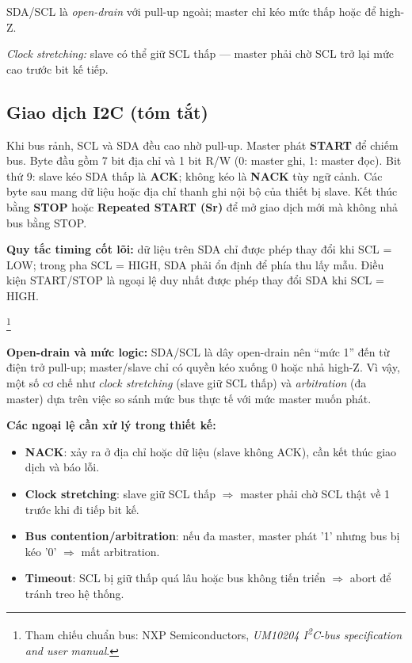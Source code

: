SDA/SCL là \emph{open-drain} với pull-up ngoài; master chỉ kéo mức thấp hoặc để high-Z.

\textit{Clock stretching:} slave có thể giữ SCL thấp — master phải chờ SCL trở lại mức cao trước bit kế tiếp.

\subsection{Giao dịch I2C (tóm tắt)}
Khi bus rảnh, SCL và SDA đều cao nhờ pull-up. Master phát \textbf{START} để chiếm bus. Byte đầu gồm 7 bit địa chỉ và 1 bit R/W (0: master ghi, 1: master đọc). Bit thứ 9: slave kéo SDA thấp là \textbf{ACK}; không kéo là \textbf{NACK} tùy ngữ cảnh. Các byte sau mang dữ liệu hoặc địa chỉ thanh ghi nội bộ của thiết bị slave. Kết thúc bằng \textbf{STOP} hoặc \textbf{Repeated START (Sr)} để mở giao dịch mới mà không nhả bus bằng STOP.

\textbf{Quy tắc timing cốt lõi:} dữ liệu trên SDA chỉ được phép thay đổi khi SCL = LOW; trong pha SCL = HIGH, SDA phải ổn định để phía thu lấy mẫu. Điều kiện START/STOP là ngoại lệ duy nhất được phép thay đổi SDA khi SCL = HIGH.

\footnote{Tham chiếu chuẩn bus: NXP Semiconductors, \emph{UM10204 I\textsuperscript{2}C-bus specification and user manual}.}

\textbf{Open-drain và mức logic:} SDA/SCL là dây open-drain nên ``mức 1'' đến từ điện trở pull-up; master/slave chỉ có quyền kéo xuống 0 hoặc nhả high-Z. Vì vậy, một số cơ chế như \emph{clock stretching} (slave giữ SCL thấp) và \emph{arbitration} (đa master) dựa trên việc so sánh mức bus thực tế với mức master muốn phát.

\textbf{Các ngoại lệ cần xử lý trong thiết kế:}
\begin{itemize}[leftmargin=1.2cm]
    \item \textbf{NACK}: xảy ra ở địa chỉ hoặc dữ liệu (slave không ACK), cần kết thúc giao dịch và báo lỗi.
    \item \textbf{Clock stretching}: slave giữ SCL thấp $\Rightarrow$ master phải chờ SCL thật về 1 trước khi đi tiếp bit kế.
    \item \textbf{Bus contention/arbitration}: nếu đa master, master phát '1' nhưng bus bị kéo '0' $\Rightarrow$ mất arbitration.
    \item \textbf{Timeout}: SCL bị giữ thấp quá lâu hoặc bus không tiến triển $\Rightarrow$ abort để tránh treo hệ thống.
\end{itemize}

